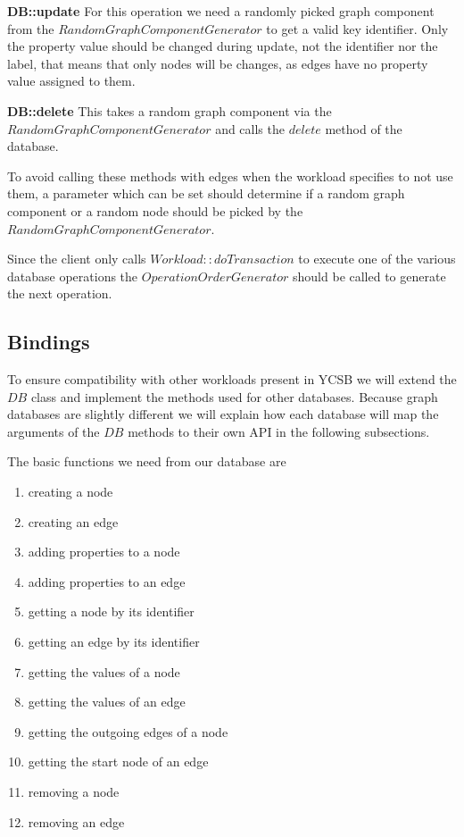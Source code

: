 \textbf{DB::update} \newline
For this operation we need a randomly picked graph component from the \linebreak
$ RandomGraphComponentGenerator $ to get a valid key identifier.
Only the property value should be changed during update,
not the identifier nor the label,
that means that only nodes will be changes,
as edges have no property value assigned to them.

\textbf{DB::delete} \newline
This takes a random graph component via the $ RandomGraphComponentGenerator $ and calls the $ delete $ method of the database.

To avoid calling these methods with edges when the workload specifies to not use them,
a parameter which can be set should determine if a random graph component or a random node should be picked by the $ RandomGraphComponentGenerator $.

Since the client only calls $ Workload::doTransaction $ to execute one of the various database operations the $ OperationOrderGenerator $ should be called to generate the next operation.

\subsection{Bindings}
\label{ch:design:se:bindings}
To ensure compatibility with other workloads present in YCSB we will extend the $ DB $ class and implement the methods used for other databases.
Because graph databases are slightly different we will explain how each database will map the arguments of the $ DB $ methods to their own API in the following subsections.

The basic functions we need from our database are

\begin{enumerate}
  \item creating a node
  \item creating an edge
  \item adding properties to a node
  \item adding properties to an edge
  \item getting a node by its identifier
  \item getting an edge by its identifier
  \item getting the values of a node
  \item getting the values of an edge
  \item getting the outgoing edges of a node
  \item getting the start node of an edge
  \item removing a node
  \item removing an edge
\end{enumerate}

